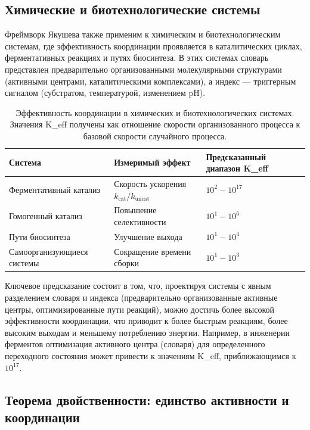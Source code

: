 \documentclass[11pt,a4paper]{article}
\begin{document}
	\subsection{Химические и биотехнологические системы}
	\label{subsec:chemical-systems}
	
	Фреймворк Якушева также применим к химическим и биотехнологическим системам, где эффективность координации проявляется в каталитических циклах, ферментативных реакциях и путях биосинтеза. В этих системах словарь представлен предварительно организованными молекулярными структурами (активными центрами, каталитическими комплексами), а индекс — триггерным сигналом (субстратом, температурой, изменением pH).
	
	\begin{table}[htbp]
		\centering
		\small
		\begin{tabular}{p{}p{}p{}}
			\toprule
			\textbf{Система} & \textbf{Измеримый эффект} & \textbf{Предсказанный диапазон K\_eff} \\
			\midrule
			Ферментативный катализ & Скорость ускорения $k_{\text{cat}}/k_{\text{uncat}}$ & $10^2 - 10^{17}$ \\
			Гомогенный катализ & Повышение селективности & $10^1 - 10^6$ \\
			Пути биосинтеза & Улучшение выхода & $10^1 - 10^4$ \\
			Самоорганизующиеся системы & Сокращение времени сборки & $10^1 - 10^3$ \\
			\bottomrule
		\end{tabular}
		\caption{Эффективность координации в химических и биотехнологических системах. Значения K\_eff получены как отношение скорости организованного процесса к базовой скорости случайного процесса.}
		\label{tab:chemical-keff}
	\end{table}
	
	Ключевое предсказание состоит в том, что, проектируя системы с явным разделением словаря и индекса (предварительно организованные активные центры, оптимизированные пути реакций), можно достичь более высокой эффективности координации, что приводит к более быстрым реакциям, более высоким выходам и меньшему потреблению энергии. Например, в инженерии ферментов оптимизация активного центра (словаря) для определенного переходного состояния может привести к значениям K\_eff, приближающимся к $10^{17}$.
	
	\subsection{Теорема двойственности: единство активности и координации}
	
\end{document}
